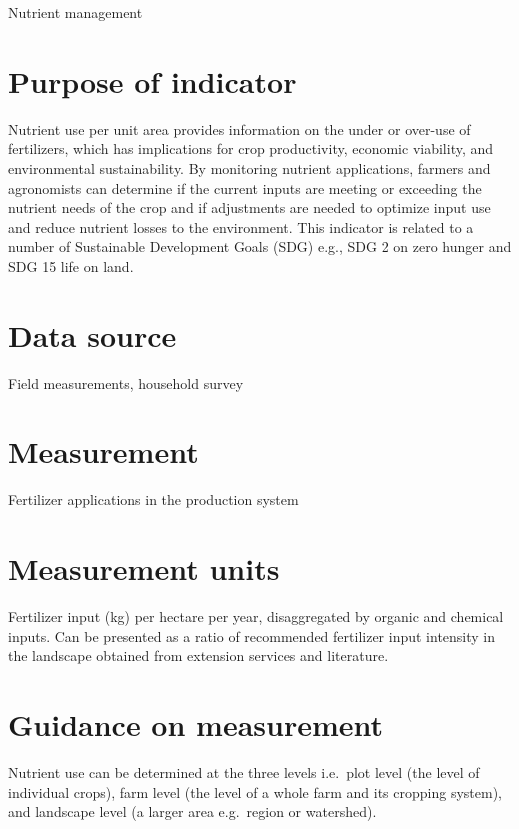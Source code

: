 \documentclass[
  letterpaper,
  DIV=11,
  numbers=noendperiod]{scrreprt}
\begin{document}
Nutrient management

\section{Purpose of indicator}\label{purpose-of-indicator-3}

Nutrient use per unit area provides information on the under or over-use
of fertilizers, which has implications for crop productivity, economic
viability, and environmental sustainability. By monitoring nutrient
applications, farmers and agronomists can determine if the current
inputs are meeting or exceeding the nutrient needs of the crop and if
adjustments are needed to optimize input use and reduce nutrient losses
to the environment. This indicator is related to a number of Sustainable
Development Goals (SDG) e.g., SDG 2 on zero hunger and SDG 15 life on
land.

\section{Data source}\label{data-source-3}

Field measurements, household survey

\section{Measurement}\label{measurement-3}

Fertilizer applications in the production system

\section{Measurement units}\label{measurement-units-3}

Fertilizer input (kg) per hectare per year, disaggregated by organic and
chemical inputs. Can be presented as a ratio of recommended fertilizer
input intensity in the landscape obtained from extension services and
literature.

\section{Guidance on measurement}\label{guidance-on-measurement-3}

Nutrient use can be determined at the three levels i.e.~plot level (the
level of individual crops), farm level (the level of a whole farm and
its cropping system), and landscape level (a larger area e.g.~region or
watershed).
\end{document}
